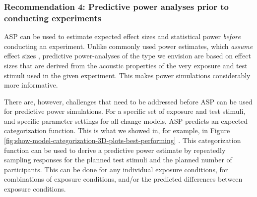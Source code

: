 \documentclass[
  11pt,
  man,floatsintext]{apa6}
\begin{document}
\subsubsection{Recommendation 4: Predictive power analyses prior to conducting experiments}\label{recommendation-4-predictive-power-analyses-prior-to-conducting-experiments}

ASP can be used to estimate expected effect sizes and statistical power \emph{before} conducting an experiment. Unlike commonly used power estimates, which \emph{assume} effect sizes \autocite[e.g., ``moderate'' effects,][]{zheng-samuel2020}, predictive power-analyses of the type we envision are based on effect sizes that are derived from the acoustic properties of the very exposure and test stimuli used in the given experiment. This makes power simulations considerably more informative.

There are, however, challenges that need to be addressed before ASP can be used for predictive power simulations. For a specific set of exposure and test stimuli, and specific parameter settings for all change models, ASP predicts an expected categorization function. This is what we showed in, for example, in Figure \ref{fig:show-model-categorization-3D-plots-best-performing} \autocites[see also, e.g.,][]{tan2021,theodore-monto2019}[ for similar approaches]{xie2021cognition}. This categorization function can be used to derive a predictive power estimate by repeatedly sampling responses for the planned test stimuli and the planned number of participants. This can be done for any individual exposure conditions, for combinations of exposure conditions, and/or the predicted differences between exposure conditions.
\end{document}
